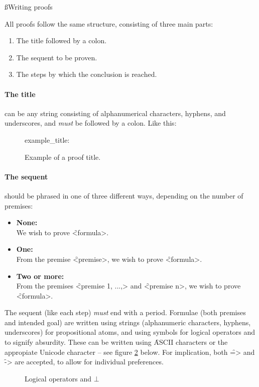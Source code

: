 \documentclass[manual.tex]{subfiles}
\begin{document}
\ss{Writing proofs}

All proofs follow the same structure, consisting of three main parts:
\begin{enumerate}
\item The title followed by a colon.
\item The sequent to be proven.
\item The steps by which the conclusion is reached.
\end{enumerate}

\paragraph{The title} can be any string consisting of alphanumerical 
characters, hyphens, and underscores, and \emph{must} be followed by
a colon. Like this:
\begin{figure}[!hb]
example\_title:
\caption{Example of a proof title.}
\label{ex:title}
\end{figure}

\paragraph{The sequent} should be phrased in one of three different ways, 
 depending on the number of premises:

\begin{itemize}
\item {\bf None:}\\ We wish to prove \f{<formula>}.
\item {\bf One:}\\ From the premise \f{<premise>}, we wish to prove 
    \f{<formula>}.
\item {\bf Two or more:}\\ From the premises \f{<premise 1, ...,>} and 
    \f{<premise n>}, we wish to prove \f{<formula>}.
\end{itemize}
The sequent (like each step) \emph{must} end with a period. Formulae (both
premises and intended goal) are written using strings (alphanumeric 
characters, hyphens, underscores) for propositional atoms, and using
symbols for logical operators and to signify absurdity. 
These can be written using
 \f{ASCII} characters or the appropiate Unicode character -- see figure
 \ref{operators} below. 
 For implication, both \f{=>} and \f{->} are accepted,
 to allow for individual preferences. 
 
\begin{figure}[!hb]

\caption{Logical operators and $\bot$}
\label{operators}
\end{figure}
\end{document}
